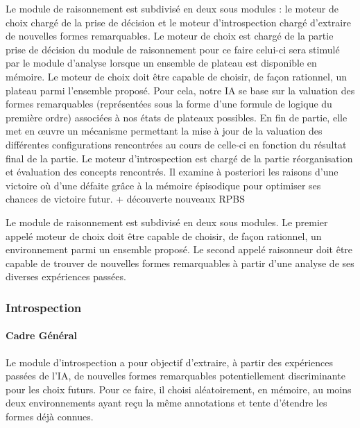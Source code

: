 
Le module de raisonnement est subdivisé en deux sous modules : le \og moteur de choix \fg{} chargé de la prise de décision et le \og moteur d'introspection \fg{} chargé d'extraire de nouvelles formes remarquables.
Le moteur de choix est chargé de la partie  prise de décision du module  de raisonnement pour ce faire celui-ci sera \og stimulé \fg{} par le module d'analyse lorsque un ensemble de plateau est disponible en mémoire. Le moteur de choix doit être capable de choisir, de façon rationnel, un plateau parmi l'ensemble proposé. Pour cela, notre IA se base sur la valuation des formes remarquables (représentées sous la forme d'une formule de logique du première ordre) associées à  nos  états de plateaux possibles. En fin de partie, elle met en œuvre un mécanisme permettant la mise à jour de la valuation des différentes \og configurations \fg{} rencontrées au cours de celle-ci en fonction du résultat final de la partie.
Le moteur d'introspection est chargé de la  partie réorganisation et évaluation des \og concepts \fg{} rencontrés. Il  examine à posteriori les raisons d'une victoire où d'une défaite grâce à  la mémoire épisodique pour optimiser ses chances de victoire futur. {+ découverte nouveaux RPBS}

Le module de raisonnement est subdivisé en deux sous modules. Le premier appelé \og moteur de choix \fg{} doit être capable de choisir, de façon rationnel, un environnement parmi un ensemble proposé. Le second appelé \og raisonneur \fg{} doit être capable de trouver de nouvelles formes remarquables à partir d'une analyse de ses diverses expériences passées.

\subsubsection{Introspection}

\paragraph{Cadre Général}

Le module d'introspection a pour objectif d'extraire, à partir des expériences passées de l'IA, de nouvelles formes remarquables potentiellement discriminante pour les choix futurs. Pour ce faire, il choisi aléatoirement, en mémoire, au moins deux environnements ayant reçu la même annotations et tente d'étendre les formes déjà connues.

